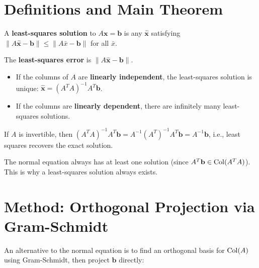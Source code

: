 \section{Definitions and Main Theorem}

\begin{definition}
A \textbf{least-squares solution} to $A\mathbf{x}=\mathbf{b}$ is any $\hat{\mathbf{x}}$ satisfying $\|A\hat{\mathbf{x}}-\mathbf{b}\|\leq\|A\bar{x}-\mathbf{b}\|$ for all $\bar{x}$.
\end{definition}

\begin{definition}
The \textbf{least-squares error} is $\|A\hat{\mathbf{x}}-\mathbf{b}\|$.
\end{definition}

\begin{theorem}[Uniqueness]
\begin{itemize}
  \item If the columns of $A$ are \textbf{linearly independent}, the least-squares solution is unique: $\hat{\mathbf{x}}=(A^TA)^{-1}A^T\mathbf{b}$.
  \item If the columns are \textbf{linearly dependent}, there are infinitely many least-squares solutions.
\end{itemize}
\end{theorem}

\begin{corollary}
If $A$ is invertible, then $(A^TA)^{-1}A^T\mathbf{b} = A^{-1}(A^T)^{-1}A^T\mathbf{b} = A^{-1}\mathbf{b}$, i.e., least squares recovers the exact solution.
\end{corollary}

\begin{fact}
The normal equation always has at least one solution (since $A^T\mathbf{b}\in\operatorname{Col}(A^TA)$). This is why a least-squares solution always exists.
\end{fact}

\section{Method: Orthogonal Projection via Gram-Schmidt}

An alternative to the normal equation is to find an orthogonal basis for $\operatorname{Col}(A)$ using Gram-Schmidt, then project $\mathbf{b}$ directly:

